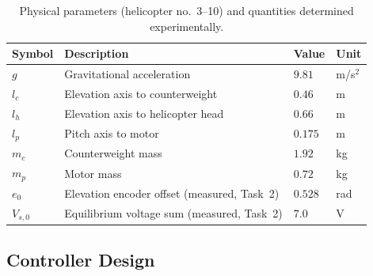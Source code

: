 \begin{table}[tbp]
	\centering
	\caption{Physical parameters (helicopter no.\ 3--10) and quantities determined experimentally.}
	\begin{tabular}{llll}
		\toprule
		Symbol & Description & Value & Unit \\
		\midrule
		$g$   & Gravitational acceleration                     & $9.81$   & m/s$^2$ \\
		$l_c$ & Elevation axis to counterweight                & $0.46$   & m \\
		$l_h$ & Elevation axis to helicopter head              & $0.66$   & m \\
		$l_p$ & Pitch axis to motor                             & $0.175$  & m \\
		$m_c$ & Counterweight mass                              & $1.92$   & kg \\
		$m_p$ & Motor mass                                       & $0.72$   & kg \\
		\midrule
		$e_0$     & Elevation encoder offset (measured, Task~2)        & $0.528$  & rad \\
		$V_{s,0}$ & Equilibrium voltage sum (measured, Task~2)         & $7.0$    & V \\
		\bottomrule
	\end{tabular}
\label{tab:parameters}
\end{table}

\subsection{Controller Design}\label{sec:controller_design}


